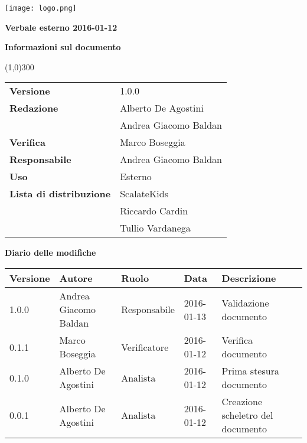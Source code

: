 \documentclass{scalatekids-article}
\begin{document}
\begin{titlepage}
  \centering
  \texttt{[image: logo.png]}\par\vspace{1cm}
  \vspace{1.5cm}
         {\Huge\bfseries Verbale esterno 2016-01-12  \par}
         \begin{center}
           \vspace{1.0cm}
                  {\large\bfseries Informazioni sul documento \par}
         \end{center}
         \vspace{-1cm}
         \begin{center}
           \line(1,0){300}
         \end{center}
         \vspace{0cm}
         \begin{tabular}[c]{l|l}
           \textbf{Versione} & 1.0.0\\
           \textbf{Redazione} & Alberto De Agostini\\ & Andrea Giacomo Baldan\\
           \textbf{Verifica} & Marco Boseggia\\
           \textbf{Responsabile} & Andrea Giacomo Baldan\\
           \textbf{Uso} & Esterno\\
           \textbf{Lista di distribuzione} & ScalateKids\\ &Riccardo Cardin\\ & Tullio Vardanega\\
         \end{tabular}
\end{titlepage}
\clearpage
\setcounter{page}{1}
\begin{flushleft}
  \vspace{0cm}
         {\large\bfseries Diario delle modifiche \par}
\end{flushleft}
\vspace{0cm}
\begin{center}
  \begin{tabular}{| l | l | l | l | l |}
    \hline
    Versione & Autore & Ruolo & Data & Descrizione \\
    \hline
    1.0.0 & Andrea Giacomo Baldan & Responsabile & 2016-01-13 & Validazione documento\\
    \hline
    0.1.1 & Marco Boseggia & Verificatore & 2016-01-12 & Verifica documento\\
    \hline
    0.1.0 & Alberto De Agostini & Analista & 2016-01-12 & Prima stesura documento\\
    \hline
    0.0.1 & Alberto De Agostini & Analista & 2016-01-12 & Creazione scheletro del documento\\
    \hline
  \end{tabular}
\end{center}
\tableofcontents
\newpage
\end{document}
